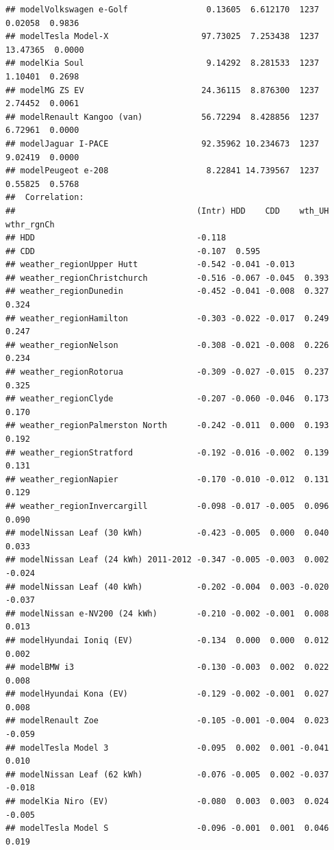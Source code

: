 \documentclass[
]{article}
\begin{document}
\begin{verbatim}
## modelVolkswagen e-Golf                0.13605  6.612170  1237   0.02058  0.9836
## modelTesla Model-X                   97.73025  7.253438  1237  13.47365  0.0000
## modelKia Soul                         9.14292  8.281533  1237   1.10401  0.2698
## modelMG ZS EV                        24.36115  8.876300  1237   2.74452  0.0061
## modelRenault Kangoo (van)            56.72294  8.428856  1237   6.72961  0.0000
## modelJaguar I-PACE                   92.35962 10.234673  1237   9.02419  0.0000
## modelPeugeot e-208                    8.22841 14.739567  1237   0.55825  0.5768
##  Correlation: 
##                                     (Intr) HDD    CDD    wth_UH wthr_rgnCh
## HDD                                 -0.118                                
## CDD                                 -0.107  0.595                         
## weather_regionUpper Hutt            -0.542 -0.041 -0.013                  
## weather_regionChristchurch          -0.516 -0.067 -0.045  0.393           
## weather_regionDunedin               -0.452 -0.041 -0.008  0.327  0.324    
## weather_regionHamilton              -0.303 -0.022 -0.017  0.249  0.247    
## weather_regionNelson                -0.308 -0.021 -0.008  0.226  0.234    
## weather_regionRotorua               -0.309 -0.027 -0.015  0.237  0.325    
## weather_regionClyde                 -0.207 -0.060 -0.046  0.173  0.170    
## weather_regionPalmerston North      -0.242 -0.011  0.000  0.193  0.192    
## weather_regionStratford             -0.192 -0.016 -0.002  0.139  0.131    
## weather_regionNapier                -0.170 -0.010 -0.012  0.131  0.129    
## weather_regionInvercargill          -0.098 -0.017 -0.005  0.096  0.090    
## modelNissan Leaf (30 kWh)           -0.423 -0.005  0.000  0.040  0.033    
## modelNissan Leaf (24 kWh) 2011-2012 -0.347 -0.005 -0.003  0.002 -0.024    
## modelNissan Leaf (40 kWh)           -0.202 -0.004  0.003 -0.020 -0.037    
## modelNissan e-NV200 (24 kWh)        -0.210 -0.002 -0.001  0.008  0.013    
## modelHyundai Ioniq (EV)             -0.134  0.000  0.000  0.012  0.002    
## modelBMW i3                         -0.130 -0.003  0.002  0.022  0.008    
## modelHyundai Kona (EV)              -0.129 -0.002 -0.001  0.027  0.008    
## modelRenault Zoe                    -0.105 -0.001 -0.004  0.023 -0.059    
## modelTesla Model 3                  -0.095  0.002  0.001 -0.041  0.010    
## modelNissan Leaf (62 kWh)           -0.076 -0.005  0.002 -0.037 -0.018    
## modelKia Niro (EV)                  -0.080  0.003  0.003  0.024 -0.005    
## modelTesla Model S                  -0.096 -0.001  0.001  0.046  0.019    

\end{verbatim}
\end{document}
